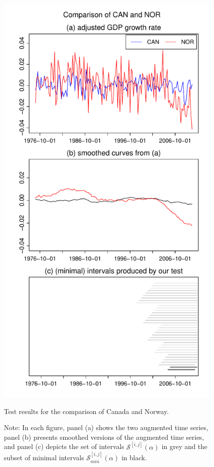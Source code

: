 \documentclass[a4paper,12pt]{article}
\begin{document}
\begin{figure}[b!]
\begin{minipage}[t]{0.49\textwidth}
\includegraphics[width=\textwidth]{Plots/CAN_vs_NOR}
\caption{Test results for the comparison of Canada and Norway.}\label{fig:Canada:Norway}
\end{minipage}
\caption*{Note: In each figure, panel (a) shows the two augmented time series, panel (b) presents smoothed versions of the augmented time series, and panel (c) depicts the set of intervals $\mathcal{S}^{[i,j]}(\alpha)$ in grey and the subset of minimal intervals $\mathcal{S}^{[i,j]}_{min}(\alpha)$ in black.}
\end{figure}
\end{document}
